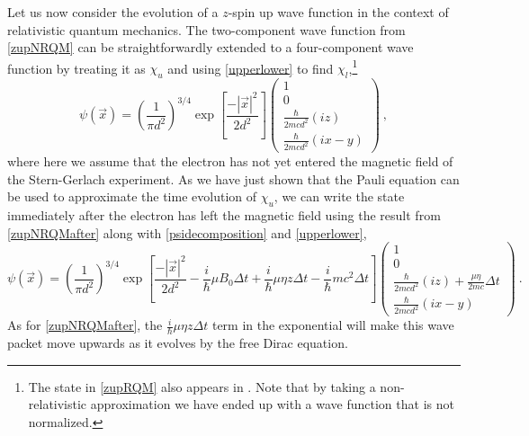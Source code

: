 \documentclass[12pt,secnumarabic,amsmath,amssymb,balancelastpage,nofootinbib]{article}
\begin{document}
Let us now consider the evolution of a $z$-spin up wave function in the context of relativistic quantum mechanics.  The two-component wave function from \eqref{zupNRQM} can be straightforwardly extended to a four-component wave function by treating it as $\chi_u$ and using \eqref{upperlower} to find $\chi_l$,\footnote{The state in \eqref{zupRQM} also appears in \citet[eq.\ 36]{howelectronsspin}.  Note that by taking a non-relativistic approximation we have ended up with a wave function that is not normalized.}
\begin{equation}
\psi(\vec{x}) = \left(\frac{1}{\pi d^2}\right)^{3/4}  \exp\left[\frac{-|\vec{x}|^2}{2 d^2}\right] \left(\begin{matrix} 1\\0\\ \frac{\hbar}{2 m c d^2}(i z) \\ \frac{\hbar}{2 m c d^2}(i x-y)\end{matrix}\right)
\ ,
\label{zupRQM}
\end{equation}
where here we assume that the electron has not yet entered the magnetic field of the Stern-Gerlach experiment.  As we have just shown that the Pauli equation can be used to approximate the time evolution of $\chi_u$, we can write the state immediately after the electron has left the magnetic field using the result from \eqref{zupNRQMafter} along with \eqref{psidecomposition} and \eqref{upperlower},
\begin{equation}
\psi(\vec{x}) = \left(\frac{1}{\pi d^2}\right)^{3/4}  \exp\left[\frac{-|\vec{x}|^2}{2 d^2} - \frac{i}{\hbar}\mu B_0 \Delta t + \frac{i}{\hbar}\mu \eta z \Delta t -\frac{i}{\hbar} m c^2 \Delta t\right] \left(\begin{matrix} 1\\0\\ \frac{\hbar}{2 m c d^2}(i z) + \frac{\mu \eta}{2 m c} \Delta t \\ \frac{\hbar}{2 m c d^2}(i x-y) \end{matrix}\right)
\ .
\label{zupRQMafter}
\end{equation}
As for \eqref{zupNRQMafter}, the $\frac{i}{\hbar}\mu \eta z \Delta t$ term in the exponential will make this wave packet move upwards as it evolves by the free Dirac equation.
\end{document}
